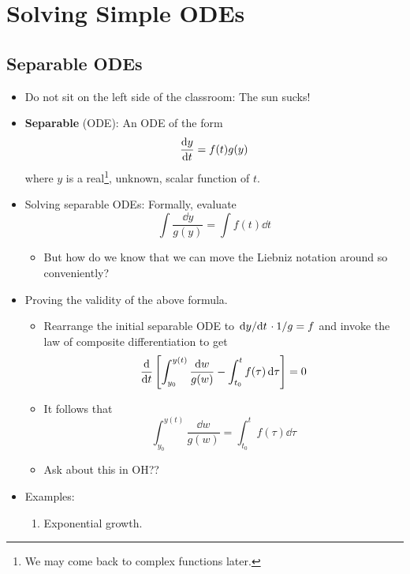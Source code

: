 \documentclass[../notes.tex]{subfiles}
\begin{document}
\chapter{Solving Simple ODEs}
\section{Separable ODEs}
\begin{itemize}
    \item {}Do not sit on the left side of the classroom: The sun sucks!
    \item \textbf{Separable} (ODE): An ODE of the form
    \begin{equation*}
        \dv{y}{t} = f(t)g(y)
    \end{equation*}
    where $y$ is a real\footnote{We may come back to complex functions later.}, unknown, scalar function of $t$.
    \item Solving separable ODEs: Formally, evaluate
    \begin{equation*}
        \int\frac{\dd{y}}{g(y)} = \int f(t)\dd{t}
    \end{equation*}
    \begin{itemize}
        \item But how do we know that we can move the Liebniz notation around so conveniently?
    \end{itemize}
    \item Proving the validity of the above formula.
    \begin{itemize}
        \item Rearrange the initial separable ODE to $\dv*{y}{t}\cdot 1/g=f$ and invoke the law of composite differentiation to get
        \begin{equation*}
            \dv{t}\left[ \int_{y_0}^{y(t)}\frac{\dd{w}}{g(w)}-\int_{t_0}^tf(\tau)\dd{\tau} \right] = 0
        \end{equation*}
        \item It follows that
        \begin{equation*}
            \int_{y_0}^{y(t)}\frac{\dd{w}}{g(w)} = \int_{t_0}^tf(\tau)\dd{\tau}
        \end{equation*}
        \item Ask about this in OH??
    \end{itemize}
    \item Examples:
    \begin{enumerate}
        \item Exponential growth.

\end{enumerate}
\end{itemize}
\end{document}
